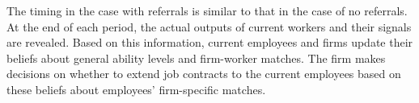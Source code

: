 \documentclass[12pt]{article}
\begin{document}


The timing in the case with referrals is similar to that in the case of no referrals. At the end of each period, the actual outputs of current workers and their signals are revealed. Based on this information, current employees and firms update their beliefs about general ability levels and firm-worker matches. The firm makes decisions on whether to extend job contracts to the current employees based on these beliefs about employees' firm-specific matches.
\end{document}
